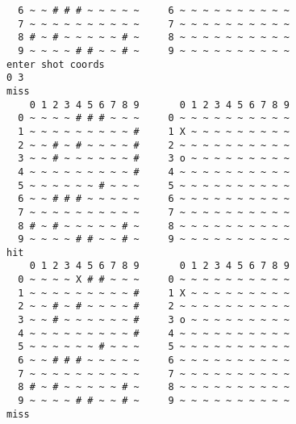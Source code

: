 \documentclass[12pt]{article}
\begin{document}
\begin{lstlisting}
  6 ~ ~ # # # ~ ~ ~ ~ ~     6 ~ ~ ~ ~ ~ ~ ~ ~ ~ ~                               
  7 ~ ~ ~ ~ ~ ~ ~ ~ ~ ~     7 ~ ~ ~ ~ ~ ~ ~ ~ ~ ~                               
  8 # ~ # ~ ~ ~ ~ ~ # ~     8 ~ ~ ~ ~ ~ ~ ~ ~ ~ ~                               
  9 ~ ~ ~ ~ # # ~ ~ # ~     9 ~ ~ ~ ~ ~ ~ ~ ~ ~ ~                               
enter shot coords                                                            
0 3                                                                            
miss                                                                            
    0 1 2 3 4 5 6 7 8 9       0 1 2 3 4 5 6 7 8 9                               
  0 ~ ~ ~ ~ # # # ~ ~ ~     0 ~ ~ ~ ~ ~ ~ ~ ~ ~ ~                               
  1 ~ ~ ~ ~ ~ ~ ~ ~ ~ #     1 X ~ ~ ~ ~ ~ ~ ~ ~ ~                               
  2 ~ ~ # ~ # ~ ~ ~ ~ #     2 ~ ~ ~ ~ ~ ~ ~ ~ ~ ~                               
  3 ~ ~ # ~ ~ ~ ~ ~ ~ #     3 o ~ ~ ~ ~ ~ ~ ~ ~ ~                               
  4 ~ ~ ~ ~ ~ ~ ~ ~ ~ #     4 ~ ~ ~ ~ ~ ~ ~ ~ ~ ~                               
  5 ~ ~ ~ ~ ~ ~ # ~ ~ ~     5 ~ ~ ~ ~ ~ ~ ~ ~ ~ ~                              
  6 ~ ~ # # # ~ ~ ~ ~ ~     6 ~ ~ ~ ~ ~ ~ ~ ~ ~ ~                               
  7 ~ ~ ~ ~ ~ ~ ~ ~ ~ ~     7 ~ ~ ~ ~ ~ ~ ~ ~ ~ ~                               
  8 # ~ # ~ ~ ~ ~ ~ # ~     8 ~ ~ ~ ~ ~ ~ ~ ~ ~ ~                              
  9 ~ ~ ~ ~ # # ~ ~ # ~     9 ~ ~ ~ ~ ~ ~ ~ ~ ~ ~                               
hit                                                                             
    0 1 2 3 4 5 6 7 8 9       0 1 2 3 4 5 6 7 8 9                               
  0 ~ ~ ~ ~ X # # ~ ~ ~     0 ~ ~ ~ ~ ~ ~ ~ ~ ~ ~                               
  1 ~ ~ ~ ~ ~ ~ ~ ~ ~ #     1 X ~ ~ ~ ~ ~ ~ ~ ~ ~                               
  2 ~ ~ # ~ # ~ ~ ~ ~ #     2 ~ ~ ~ ~ ~ ~ ~ ~ ~ ~                               
  3 ~ ~ # ~ ~ ~ ~ ~ ~ #     3 o ~ ~ ~ ~ ~ ~ ~ ~ ~                               
  4 ~ ~ ~ ~ ~ ~ ~ ~ ~ #     4 ~ ~ ~ ~ ~ ~ ~ ~ ~ ~                               
  5 ~ ~ ~ ~ ~ ~ # ~ ~ ~     5 ~ ~ ~ ~ ~ ~ ~ ~ ~ ~                              
  6 ~ ~ # # # ~ ~ ~ ~ ~     6 ~ ~ ~ ~ ~ ~ ~ ~ ~ ~                            
  7 ~ ~ ~ ~ ~ ~ ~ ~ ~ ~     7 ~ ~ ~ ~ ~ ~ ~ ~ ~ ~                              
  8 # ~ # ~ ~ ~ ~ ~ # ~     8 ~ ~ ~ ~ ~ ~ ~ ~ ~ ~                               
  9 ~ ~ ~ ~ # # ~ ~ # ~     9 ~ ~ ~ ~ ~ ~ ~ ~ ~ ~                                                                                                  
miss                                                                                                                                                      

\end{lstlisting}
\end{document}

